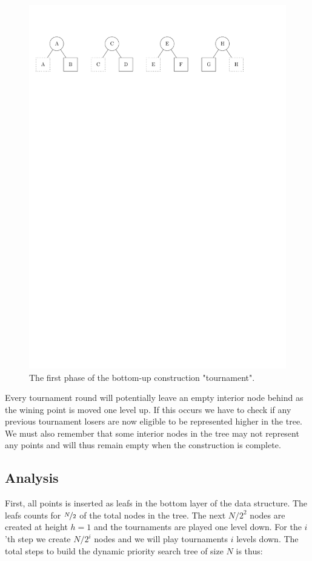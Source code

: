 \documentclass[twoside,11pt,openright]{report}
\begin{document}
\begin{figure}[h]
	\centering
	\includegraphics[scale=0.68]{../figures/internal_pst_dynamic_construction}
	\caption{The first phase of the bottom-up construction "tournament".}
	\label{fig:dynamic_pst_construction}
\end{figure}

Every tournament round will potentially leave an empty interior node behind as the wining point is moved one level up. If this occurs we have to check if any previous tournament losers are now eligible to be represented higher in the tree. We must also remember that some interior nodes in the tree may not represent any points and will thus remain empty when the construction is complete.

\subsection*{Analysis}
First, all points is inserted as leafs in the bottom layer of the data structure. The leafs counts for $\nicefrac{N}{2}$ of the total nodes in the tree. The next $N/2^2$ nodes are created at height $h = 1$ and the tournaments are played one level down. For the $i$'th step we create $N/2^i$ nodes and we will play tournaments $i$ levels down. The total steps to build the dynamic priority search tree of size $N$ is thus:
\end{document}
